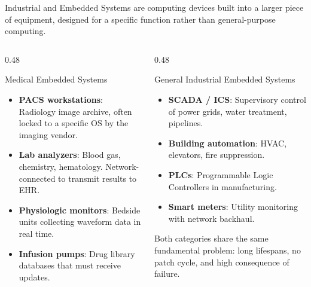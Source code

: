 \documentclass[aspectratio=169]{beamer}  %
\begin{document}
\begin{frame}{Industrial and Embedded Systems}
    \footnotesize
     are computing devices built into a larger piece of equipment, designed for a specific function rather than general-purpose computing.

    \vspace{0.3em}
    \begin{columns}[T]
        \begin{column}{0.48\textwidth}
            \begin{block}{Medical Embedded Systems}
                \footnotesize
                \begin{itemize}
                    \item \textbf{PACS workstations}: Radiology image archive, often locked to a specific OS by the imaging vendor.
                    \item \textbf{Lab analyzers}: Blood gas, chemistry, hematology. Network-connected to transmit results to EHR.
                    \item \textbf{Physiologic monitors}: Bedside units collecting waveform data in real time.
                    \item \textbf{Infusion pumps}: Drug library databases that must receive updates.
                \end{itemize}
            \end{block}
        \end{column}
        \begin{column}{0.48\textwidth}
            \begin{block}{General Industrial Embedded Systems}
                \footnotesize
                \begin{itemize}
                    \item \textbf{SCADA / ICS}: Supervisory control of power grids, water treatment, pipelines.
                    \item \textbf{Building automation}: HVAC, elevators, fire suppression.
                    \item \textbf{PLCs}: Programmable Logic Controllers in manufacturing.
                    \item \textbf{Smart meters}: Utility monitoring with network backhaul.
                \end{itemize}
                \vspace{0.2em}
                Both categories share the same fundamental problem: long lifespans, no patch cycle, and high consequence of failure.
            \end{block}
        \end{column}
    \end{columns}
\end{frame}
\end{document}
